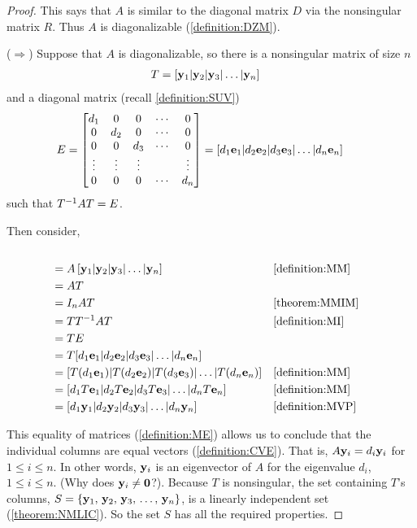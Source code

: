 \documentclass{ximera}
\begin{document}
\begin{theorem}
\begin{proof}
This says that $A$ is similar to the diagonal matrix $D$ via the nonsingular matrix $R$.  Thus $A$ is diagonalizable (\ref{definition:DZM}).

($\Rightarrow$)  Suppose that $A$ is diagonalizable, so there is a nonsingular matrix of size $n$
\begin{align*}
T&=\left\lbrack\mathbf{y}_{1}|\mathbf{y}_{2}|\mathbf{y}_{3}|\ldots|\mathbf{y}_{n}\right\rbrack
\end{align*}
and a diagonal matrix (recall \ref{definition:SUV})
\begin{align*}
E&=\begin{bmatrix}
d_1 & 0 & 0 &\cdots & 0\\
0 &d_2 & 0 &\cdots & 0\\
0 & 0 &d_3 &\cdots & 0\\
\vdots & \vdots & \vdots & & \vdots\\
0 & 0 & 0 &\cdots & d_n
\end{bmatrix}
=[d_1\mathbf{e}_1|d_2\mathbf{e}_2|d_3\mathbf{e}_3|\ldots|d_n\mathbf{e}_n]&&\text{}
\end{align*}
such that $T^{-1}AT=E$.

Then consider,
\begin{align*}
[A\vect{y}_1|A\vect{y}_2|A\vect{y}_3&|\ldots|A\vect{y}_n]\\
&=A\matrixcolumns{y}{n}
&&\ref{definition:MM}\\
&=AT\\
&=I_nAT
&&\ref{theorem:MMIM}\\
&=T\inverse{T}AT
&&\ref{definition:MI}\\
&=TE\\
&=T[d_1\vect{e}_1|d_2\vect{e}_2|d_3\vect{e}_3|\ldots|d_n\vect{e}_n]\\
&=[T(d_1\vect{e}_1)|T(d_2\vect{e}_2)|T(d_3\vect{e}_3)|\ldots|T(d_n\vect{e}_n)]
&&\ref{definition:MM}\\
&=[d_1T\vect{e}_1|d_2T\vect{e}_2|d_3T\vect{e}_3|\ldots|d_nT\vect{e}_n]
&&\ref{definition:MM}\\
&=[d_1\vect{y}_1|d_2\vect{y}_2|d_3\vect{y}_3|\ldots|d_n\vect{y}_n]
&&\ref{definition:MVP}
\end{align*}

This equality of matrices (\ref{definition:ME}) allows us to conclude
that the individual columns are equal vectors (\ref{definition:CVE}).
That is, $A\mathbf{y}_i=d_i\mathbf{y}_i$ for $1\leq i\leq n$.  In other
words, $\mathbf{y}_i$ is an eigenvector of $A$ for the eigenvalue $d_i$,
$1\leq i\leq n$.  (Why does $\mathbf{y}_i\neq\mathbf{0}$?).  Because
$T$ is nonsingular, the set containing $T$'s columns,
$S=\left\{\mathbf{y}_{1},\,\mathbf{y}_{2},\,\mathbf{y}_{3},\,\ldots,\,\mathbf{y}_{n}\right\}$, is a linearly independent set
(\ref{theorem:NMLIC}).  So the set $S$ has all the required
properties.

\end{proof}
\end{theorem}
\end{document}
